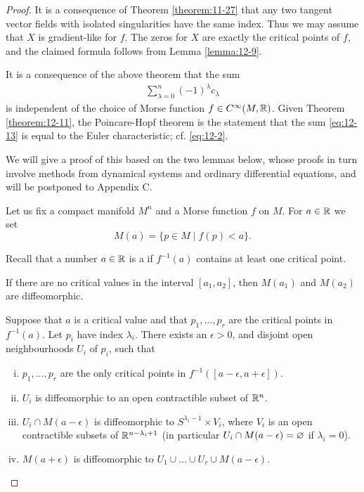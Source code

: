 \begin{proof}
  It is a consequence of Theorem \ref{theorem:11-27} that any two tangent vector fields
with isolated singularities have the same index. Thus we may assume that $X$ is
gradient-like for $f$. The zeros for $X$ are exactly the critical points of $f$, and the
claimed formula follows from Lemma \ref{lemma:12-9}.

It is a consequence of the above theorem that the sum
\begin{align}\label{eq:12-13}
  \sum_{\lambda = 0}^{n }{(-1)^\lambda c_\lambda}
\end{align}
is independent of the choice of Morse function $f\in C^\infty(M, {\mathbb{R}})$. Given Theorem \ref{theorem:12-11}, the 
Poincare-Hopf theorem is the statement that the sum \eqref{eq:12-13} is equal to the Euler characteristic; cf. \eqref{eq:12-2}.

We will give a proof of this based on the two lemmas below, whose proofs in
turn involve methods from dynamical systems and ordinary differential equations,
and will be postponed to Appendix C.

Let us fix a compact manifold $M^n$ and a Morse function $f$ on $M$. For $a\in{\ensuremath{\mathbb{R}}}$ we set
\[
  M(a) = \{p\in M\mid f(p)<a\}.
\]

Recall that a number $a\in{\ensuremath{\mathbb{R}}}$ is a  if $f^{-1}(a)$ contains at least one
critical point.

\begin{lemma}\label{lemma:12-12}
  If there are no critical values in the interval $[a_1, a_2]$, then $M(a_1)$ and $M(a_2)$ are diffeomorphic.
\end{lemma}

\begin{lemma}\label{lemma:12-13}
  Suppose that $a$ is a critical value and that $p_1, \ldots, p_r$ are the critical
points in $f^{-1}(a)$. Let $p_i$ have index $\lambda_i$. There exists an $\epsilon > 0$, and disjoint open
neighbourhoods $U_i$ of $p_i$, such that
\begin{enumerate}[(i)]
  \item $p_1,\ldots,p_r$ are the only critical points in $f^{-1}([a-\epsilon, a+\epsilon])$.
  \item $U_i$ is diffeomorphic to an open contractible subset of ${\mathbb{R}}^n$.
  \item $U_i\cap M(a-\epsilon)$ is diffeomorphic to $S^{\lambda_i-1}\times V_i$, where $V_i$ is an open
    contractible subsets of ${\mathbb{R}}^{n-\lambda_i+1}$ (in particular $U_i\cap M(a-\epsilon) = \varnothing$ if $\lambda_i=0$).
  \item $M(a+\epsilon)$ is diffeomorphic to $U_1\cup\ldots\cup U_r\cup M(a-\epsilon)$.
\end{enumerate}
\end{lemma}
\end{proof}

